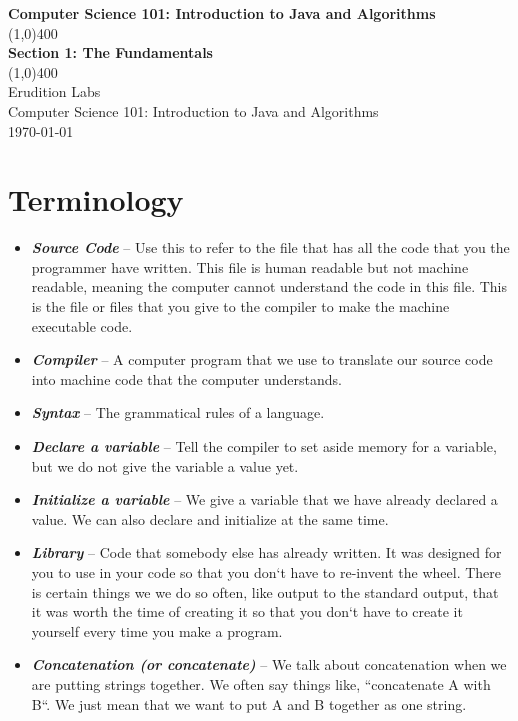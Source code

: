 \documentclass[11]{article}
\begin{document}
\begin{titlepage}
\begin{center}
\vspace{1cm}
\Large{\textbf{Computer Science 101: Introduction to Java and Algorithms}}\\
\vfill
\line(1,0){400}\\
\huge{\textbf{Section 1: The Fundamentals}}\\
\line(1,0){400}\\
\vfill
Erudition Labs\\
Computer Science 101: Introduction to Java and Algorithms\\
\today\\
\end{center}
\end{titlepage}

\tableofcontents
\thispagestyle{empty}
\clearpage
\setcounter{page}{1}

\section{Terminology}
\begin{itemize}
  \item \textbf{\textit{Source Code}} --
  Use this to refer to the file that has all the code that you the programmer have written. This file is human readable but not machine readable, meaning the computer cannot understand the code in this file. This is the file or files that you give to the compiler to make the machine executable code.

  \item \textbf{\textit{Compiler}} --
	A computer program that we use to translate our source code into machine code that the computer understands.
	
	  \item \textbf{\textit{Syntax}} --
	The grammatical rules of a language.
	
	 \item \textbf{\textit{Declare a variable}} --
	Tell the compiler to set aside memory for a variable, but we do not give the variable a value yet.
	
	  \item \textbf{\textit{Initialize a variable}} --
	We give a variable that we have already declared a value. We can also declare and initialize at the same time.
	
	  \item \textbf{\textit{Library}} --
	Code that somebody else has already written. It was designed for you to use in your code so that you don`t have to re-invent the wheel. There is certain things we we do so often, like output to the standard output, that it was worth the time of creating it so that you don`t have to create it yourself every time you make a program.
	
	\item \textbf{\textit{Concatenation (or concatenate)}} --
	We talk about concatenation when we are putting strings together. We often say things like, ``concatenate A with B``. We just mean that we want to put A and B together as one string.
\end{itemize}
\end{document}
